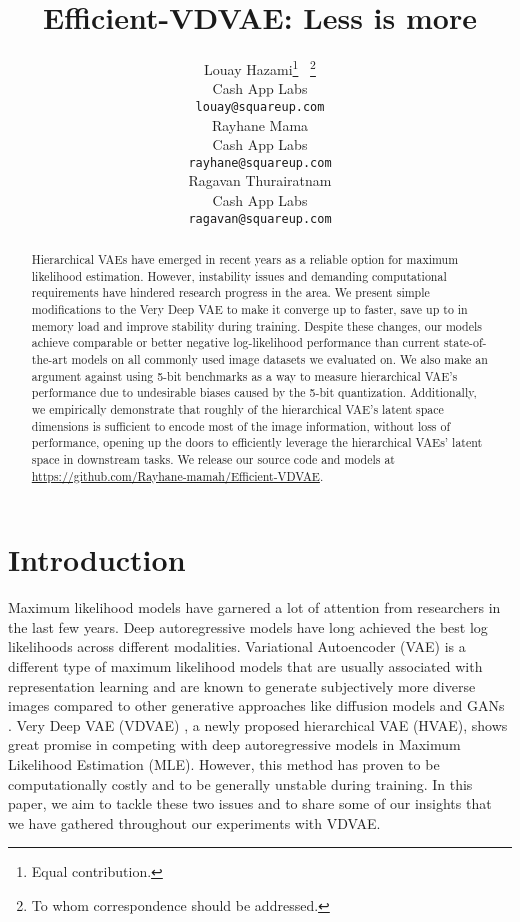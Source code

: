 \documentclass{article}
\title{Efficient-VDVAE: Less is more
}
\author{
  Louay Hazami\thanks{Equal contribution.} \ \thanks{To whom correspondence should be addressed.} \\
  Cash App Labs \\
  \texttt{louay@squareup.com} \\
  \And
  Rayhane Mama\footnotemark[1] \\
  Cash App Labs \\
  \texttt{rayhane@squareup.com} \\
  \And
  Ragavan Thurairatnam \\
  Cash App Labs \\
  \texttt{ragavan@squareup.com} \\
}
\begin{document}
\maketitle

\begin{abstract}
Hierarchical VAEs have emerged in recent years as a reliable option for maximum likelihood estimation. However, instability issues and demanding computational requirements have hindered research progress in the area. We present simple modifications to the Very Deep VAE to make it converge up to  faster, save up to  in memory load and improve stability during training. Despite these changes, our models achieve comparable or better negative log-likelihood performance than current state-of-the-art models on all  commonly used image datasets we evaluated on. We also make an argument against using 5-bit benchmarks as a way to measure hierarchical VAE's performance due to undesirable biases caused by the 5-bit quantization. Additionally, we empirically demonstrate that roughly  of the hierarchical VAE's latent space dimensions is sufficient to encode most of the image information, without loss of performance, opening up the doors to efficiently leverage the hierarchical VAEs' latent space in downstream tasks. We release our source code and models at \href{https://github.com/Rayhane-mamah/Efficient-VDVAE}{\url{https://github.com/Rayhane-mamah/Efficient-VDVAE}}.
\end{abstract}




\section{Introduction}
Maximum likelihood models have garnered a lot of attention from researchers in the last few years. Deep autoregressive models\cite{van2016conditional, salimans2017pixelcnn++, sadeghi2019pixelvae++, augmented_sparse_transformer} have long achieved the best log likelihoods across different modalities. Variational Autoencoder\cite{kingma2014autoencoding, rezende2014stochastic} (VAE) is a different type of maximum likelihood models that are usually associated with representation learning \cite{bengio_rl, radford_rl} and are known to generate subjectively more diverse images\cite{vae_diversity} compared to other generative approaches like diffusion models \cite{diffusion_1, diffusion_2, diffusion_3} and GANs \cite{radford_rl, gan1, gan2, gan3}. Very Deep VAE (VDVAE) \cite{child2021very}, a newly proposed hierarchical VAE (HVAE), shows great promise in competing with deep autoregressive models in Maximum Likelihood Estimation (MLE). However, this method has proven to be computationally costly and to be generally unstable during training. In this paper, we aim to tackle these two issues and to share some of our insights that we have gathered throughout our experiments with VDVAE.
\end{document}

